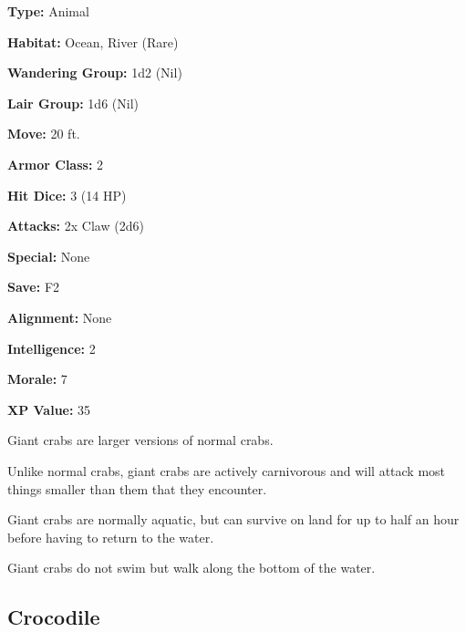 \begin{multicols*}{2}
{{\textbf{Type:} Animal

\textbf{Habitat:} Ocean, River (Rare)

\textbf{Wandering Group:} 1d2 (Nil)

\textbf{Lair Group:} 1d6 (Nil)

\textbf{Move:} 20 ft.

\textbf{Armor Class:} 2

\textbf{Hit Dice:} 3 (14 HP)

\textbf{Attacks:} 2x Claw (2d6)

\textbf{Special:} None

\textbf{Save:} F2

\textbf{Alignment:} None

\textbf{Intelligence:} 2

\textbf{Morale:} 7

\textbf{XP Value:} 35}}

Giant crabs are larger versions of normal crabs.

Unlike normal crabs, giant crabs are actively carnivorous and will attack most things smaller than them that they encounter.

Giant crabs are normally aquatic, but can survive on land for up to half an hour before having to return to the water.

Giant crabs do not swim but walk along the bottom of the water.

\subsection{Crocodile}
\end{multicols*}
